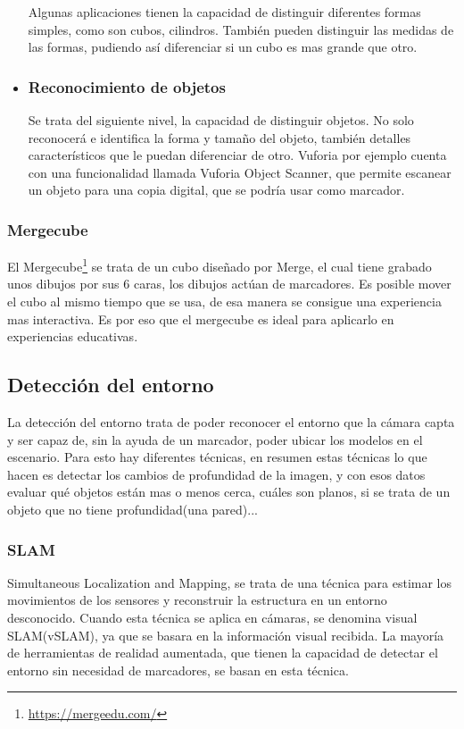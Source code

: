 \begin{itemize}
		Algunas aplicaciones tienen la capacidad de distinguir diferentes formas simples, como son cubos, cilindros. También pueden distinguir las medidas de las formas, pudiendo así diferenciar si un cubo es mas grande que otro.
		\item \subsubsection{Reconocimiento de objetos}
		Se trata del siguiente nivel, la capacidad de distinguir objetos. No solo reconocerá e identifica la forma y tamaño del objeto, también detalles característicos que le puedan diferenciar de otro. Vuforia por ejemplo cuenta con una funcionalidad llamada Vuforia Object Scanner, que permite escanear un objeto para una copia digital, que se podría usar como marcador.
	\end{itemize}
	\subsubsection{Mergecube}
	El Mergecube\footnote{\url{https://mergeedu.com/}} se trata de un cubo diseñado por Merge, el cual tiene grabado unos dibujos por sus 6 caras, los dibujos actúan de marcadores. Es posible mover el cubo al mismo tiempo que se usa, de esa manera se consigue una experiencia mas interactiva. Es por eso que el mergecube es ideal para aplicarlo en experiencias educativas.
	\subsection{Detección del entorno}
	La detección del entorno trata de poder reconocer el entorno que la cámara capta y ser capaz de, sin la ayuda de un marcador, poder ubicar los modelos en el escenario.
	Para esto hay diferentes técnicas, en resumen estas técnicas lo que hacen es detectar los cambios de profundidad de la imagen, y con esos datos evaluar qué objetos están mas o menos cerca, cuáles son planos, si se trata de un objeto que no tiene profundidad(una pared)...
	\subsubsection{SLAM}
	Simultaneous Localization and Mapping, se trata de una técnica para estimar los movimientos de los sensores y reconstruir la estructura en un entorno desconocido. Cuando esta técnica se aplica en cámaras, se denomina visual SLAM(vSLAM), ya que se basara en la información visual recibida.
	La mayoría de herramientas de realidad aumentada, que tienen la capacidad de detectar el entorno sin necesidad de marcadores, se basan en esta técnica.
	
